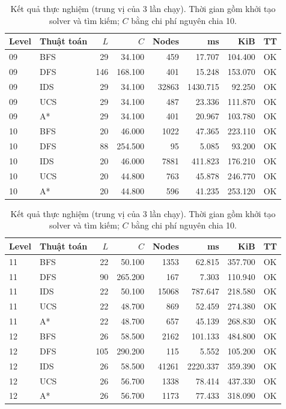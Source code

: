 \begin{table}[htbp]
\centering
\small
\begin{tabular}{llrrrrrl}
\hline
Level & Thuật toán & $L$ & $C$ & Nodes & ms & KiB & TT \\
\hline
09 & BFS & 29 & 34.100 & 459 & 17.707 & 104.400 & OK \\
09 & DFS & 146 & 168.100 & 401 & 15.248 & 153.070 & OK \\
09 & IDS & 29 & 34.100 & 32863 & 1430.715 & 92.250 & OK \\
09 & UCS & 29 & 34.100 & 487 & 23.336 & 111.870 & OK \\
09 & A* & 29 & 34.100 & 401 & 20.967 & 103.780 & OK \\
10 & BFS & 20 & 46.000 & 1022 & 47.365 & 223.110 & OK \\
10 & DFS & 88 & 254.500 & 95 & 5.085 & 93.200 & OK \\
10 & IDS & 20 & 46.000 & 7881 & 411.823 & 176.210 & OK \\
10 & UCS & 20 & 44.800 & 763 & 45.878 & 246.770 & OK \\
10 & A* & 20 & 44.800 & 596 & 41.235 & 253.120 & OK \\
\hline
\end{tabular}
\caption{Kết quả thực nghiệm (trung vị của 3 lần chạy). Thời gian gồm khởi tạo solver và tìm kiếm; $C$ bằng chi phí nguyên chia 10.}
\end{table}

\begin{table}[htbp]
\centering
\small
\begin{tabular}{llrrrrrl}
\hline
Level & Thuật toán & $L$ & $C$ & Nodes & ms & KiB & TT \\
\hline
11 & BFS & 22 & 50.100 & 1353 & 62.815 & 357.700 & OK \\
11 & DFS & 90 & 265.200 & 167 & 7.303 & 110.940 & OK \\
11 & IDS & 22 & 50.100 & 15068 & 787.647 & 218.580 & OK \\
11 & UCS & 22 & 48.700 & 869 & 52.459 & 274.380 & OK \\
11 & A* & 22 & 48.700 & 657 & 45.139 & 268.830 & OK \\
12 & BFS & 26 & 58.500 & 2162 & 101.133 & 484.800 & OK \\
12 & DFS & 105 & 290.200 & 115 & 5.552 & 105.200 & OK \\
12 & IDS & 26 & 58.500 & 41261 & 2220.337 & 359.390 & OK \\
12 & UCS & 26 & 56.700 & 1338 & 78.414 & 437.330 & OK \\
12 & A* & 26 & 56.700 & 1173 & 77.433 & 318.090 & OK \\
\hline
\end{tabular}
\caption{Kết quả thực nghiệm (trung vị của 3 lần chạy). Thời gian gồm khởi tạo solver và tìm kiếm; $C$ bằng chi phí nguyên chia 10.}
\end{table}

